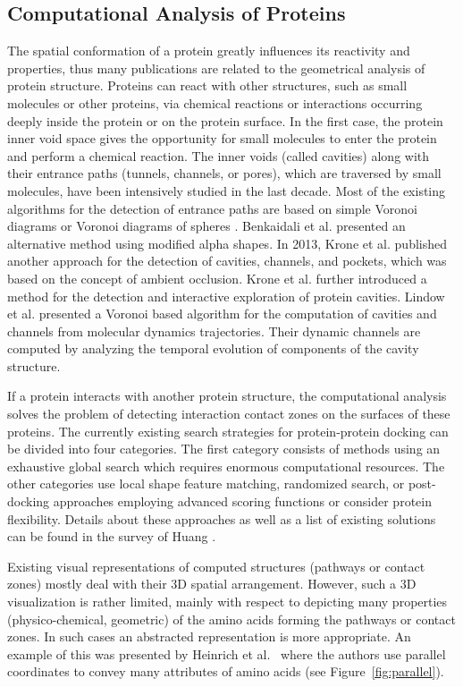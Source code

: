 \documentclass[11pt,a4paper,titlepage,oneside,onecolumn]{article}
\begin{document}
\subsection{Computational Analysis of Proteins}
The spatial conformation of a protein greatly influences its reactivity and properties, thus many publications are related to the geometrical analysis of protein structure. 
Proteins can react with other structures, such as small molecules or other proteins, via chemical reactions or interactions occurring deeply inside the protein or on the protein surface.
In the first case, the protein inner void space gives the opportunity for small molecules to enter the protein and perform a chemical reaction. 
The inner voids (called cavities) along with their entrance paths (tunnels, channels, or pores), which are traversed by small molecules, have been intensively studied in the last decade.   
Most of the existing algorithms for the detection of entrance paths are based on simple Voronoi diagrams \cite{caver,mole,molaxis} or Voronoi diagrams of spheres \cite{Kim,Lindow2011}. Benkaidali et al. \cite{Benkaidali} presented an alternative method using modified alpha shapes. 
In 2013, Krone et al. \cite{Krone2013} published another approach for the detection of cavities, channels, and pockets, which was based on the concept of ambient occlusion. 
Krone et al. \cite{Krone2011} further introduced a method for the detection and interactive exploration of protein cavities. 
Lindow et al. \cite{Lindow2012} presented a Voronoi based algorithm for the computation of cavities and channels from molecular dynamics trajectories. 
Their dynamic channels are computed by analyzing the temporal evolution of components of the cavity structure.

If a protein interacts with another protein structure, the computational analysis solves the problem of detecting interaction contact zones on the surfaces of these proteins. 
The currently existing search strategies for protein-protein docking can be divided into four categories. 
The first category consists of methods using an exhaustive global search which requires enormous computational resources.
The other categories use local shape feature matching, randomized search, or post-docking approaches employing advanced scoring functions or consider protein flexibility. Details about these approaches as well as a list of existing solutions can be found in the survey of Huang \cite{huang}.

Existing visual representations of computed structures (pathways or contact zones) mostly deal with their 3D spatial arrangement. 
However, such a 3D visualization is rather limited, mainly with respect to depicting many properties (physico-chemical, geometric) of the amino acids forming the pathways or contact zones. In such cases an abstracted representation is more appropriate. 
An example of this was presented by Heinrich et al.~\cite{Heinrich2014} where the authors use parallel coordinates to convey many attributes of amino acids (see Figure~\ref{fig:parallel}). 
\end{document}
